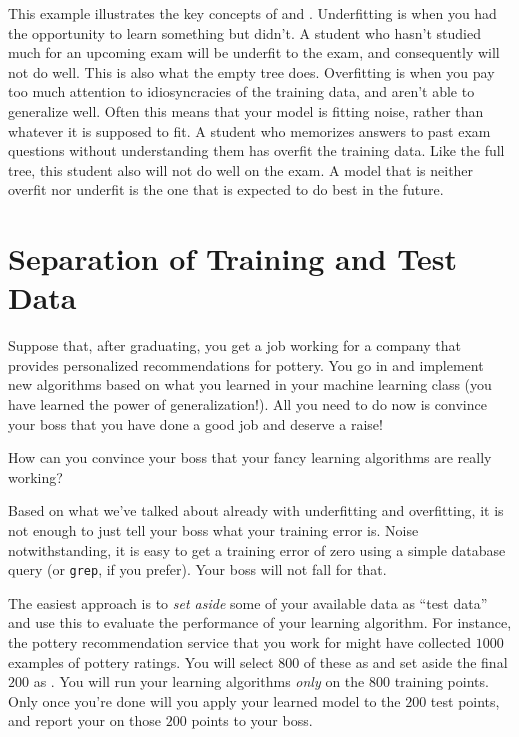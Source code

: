 
This example illustrates the key concepts of 
and .  Underfitting is when you had the
opportunity to learn something but didn't.  A student who hasn't
studied much for an upcoming exam will be underfit to the exam, and
consequently will not do well.  This is also what the empty tree
does.  Overfitting is when you pay too much attention to
idiosyncracies of the training data, and aren't able to generalize
well.  Often this means that your model is fitting noise, rather than
whatever it is supposed to fit.  A student who memorizes answers to
past exam questions without understanding them has overfit the
training data.  Like the full tree, this student also will not do well
on the exam.  A model that is neither overfit nor underfit is the one
that is expected to do best in the future.

\section{Separation of Training and Test Data}

Suppose that, after graduating, you get a job working for a company
that provides personalized recommendations for pottery.  You go in and
implement new algorithms based on what you learned in your machine
learning class (you have learned the power of generalization!).  All
you need to do now is convince your boss that you have done a good job
and deserve a raise!

How can you convince your boss that your fancy learning algorithms are
really working?

Based on what we've talked about already with underfitting and
overfitting, it is not enough to just tell your boss what your
training error is.  Noise notwithstanding, it is easy to get a
training error of zero using a simple database query (or {\tt grep},
if you prefer).  Your boss will not fall for that.

The easiest approach is to \emph{set aside} some of your available
data as ``test data'' and use this to evaluate the performance of your
learning algorithm.  For instance, the pottery recommendation service
that you work for might have collected $1000$ examples of pottery
ratings.  You will select $800$ of these as 
and set aside the final $200$ as .  You will run
your learning algorithms \emph{only} on the $800$ training points.
Only once you're done will you apply your learned model to the $200$
test points, and report your  on those $200$
points to your boss.

